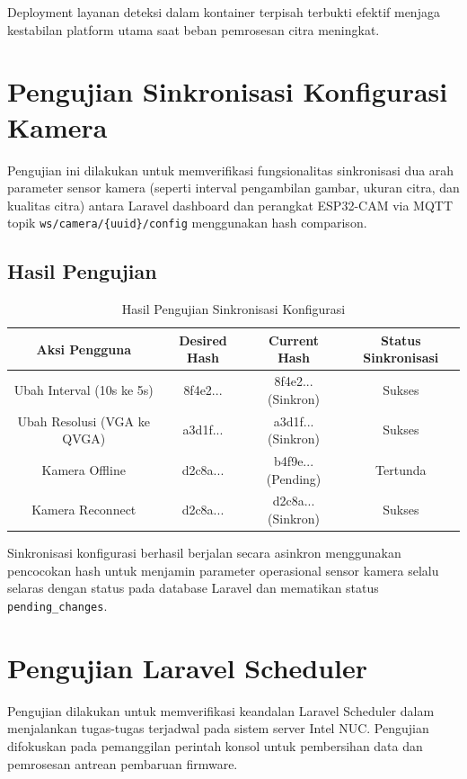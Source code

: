 Deployment layanan deteksi dalam kontainer terpisah terbukti efektif menjaga kestabilan platform utama saat beban pemrosesan citra meningkat.

\section{Pengujian Sinkronisasi Konfigurasi Kamera}

Pengujian ini dilakukan untuk memverifikasi fungsionalitas sinkronisasi dua arah parameter sensor kamera (seperti interval pengambilan gambar, ukuran citra, dan kualitas citra) antara Laravel dashboard dan perangkat ESP32-CAM via MQTT topik \texttt{ws/camera/\{uuid\}/config} menggunakan hash comparison.

\subsection{Hasil Pengujian}

\begin{table}[H]
	\centering
	\caption{Hasil Pengujian Sinkronisasi Konfigurasi}
	\begin{tabular}{|c|c|c|c|}
		\hline
		Aksi Pengguna & Desired Hash & Current Hash & Status Sinkronisasi \\
		\hline
		Ubah Interval (10s ke 5s) & 8f4e2... & 8f4e2... (Sinkron) & Sukses \\
		Ubah Resolusi (VGA ke QVGA) & a3d1f... & a3d1f... (Sinkron) & Sukses \\
		Kamera Offline & d2c8a... & b4f9e... (Pending) & Tertunda \\
		Kamera Reconnect & d2c8a... & d2c8a... (Sinkron) & Sukses \\
		\hline
	\end{tabular}
\end{table}

Sinkronisasi konfigurasi berhasil berjalan secara asinkron menggunakan pencocokan hash untuk menjamin parameter operasional sensor kamera selalu selaras dengan status pada database Laravel dan mematikan status \texttt{pending\_changes}.

\section{Pengujian Laravel Scheduler}

Pengujian dilakukan untuk memverifikasi keandalan Laravel Scheduler dalam menjalankan tugas-tugas terjadwal pada sistem server Intel NUC. Pengujian difokuskan pada pemanggilan perintah konsol untuk pembersihan data dan pemrosesan antrean pembaruan firmware.

